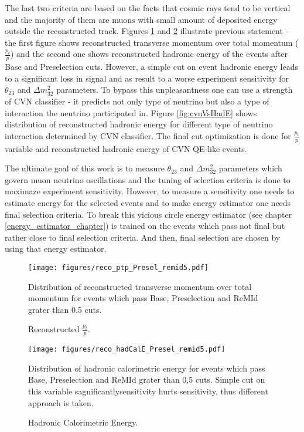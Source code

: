 The last two criteria are based on the facts that cosmic rays tend to be vertical and the majority of them are 
muons with small amount of deposited energy outside the reconstructed track. Figures \ref{fig:ptp} and \ref{fig:calHadE}
illustrate previous statement - the first figure shows reconstructed transverse momentum over total momentum 
($\frac{p_t}{p}$) and the second one shows reconstructed hadronic energy of the events after Base and Preselection 
cuts. However, a simple cut on event hadronic energy leads to a significant loss in signal and as result to a 
worse experiment sensitivity for $\theta_{23}$ and $\Delta m^2_{32}$ parameters. To bypass this unpleasantness one 
can use a strength of CVN classifier - it predicts not only type of neutrino but also a type of interaction the 
neutrino participated in. Figure \ref{fig:cvnVsHadE} shows distribution of reconstructed hadronic energy for 
different type of neutrino interaction determined by CVN classifier. The final cut optimization is done for 
$\frac{p_t}{p}$ variable and reconstructed hadronic energy of CVN QE-like events.

The ultimate goal of this work is to measure $\theta_{23}$ and $\Delta m^2_{32}$ parameters which govern muon
neutrino oscillations and the tuning of selection criteria is done to maximaze experiment sensitivity. However,
to measure a sensitivity one needs to estimate energy for the selected events and to make energy estimator one 
needs final selection criteria. To break this vicious circle energy estimator (see chapter \ref{energy_estimator_chapter})
is trained on the events which pass not final but rather close to final selection criteria. And then, final 
selection are chosen by using that energy estimator.
\begin{figure}[h]
\centering
\texttt{[image: figures/reco\_ptp\_Presel\_remid5.pdf]}
\caption{Reconstructed $\frac{p_t}{p}$.}
{Distribution of reconstructed transverse momentum over total momentum for events which pass Base, Preselection and
ReMId grater than 0.5 cuts. }
\label{fig:ptp}
\end{figure}
\begin{figure}[h]
\centering
\texttt{[image: figures/reco\_hadCalE\_Presel\_remid5.pdf]}
\caption{Hadronic Calorimetric Energy.}
{Distribution of hadronic calorimetric energy for events which pass Base, Preselection and ReMId grater than 0,5 cuts. 
Simple cut on this variable sagnificantlysensitivity hurts sensitivity, thus different approach is taken.}
\label{fig:calHadE}
\end{figure}

